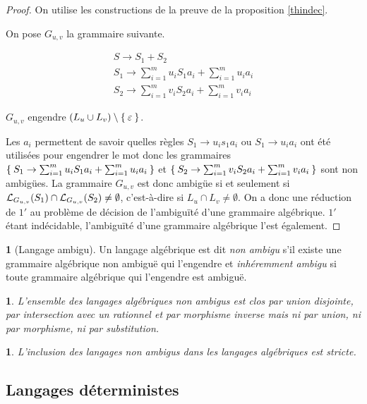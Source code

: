 \documentclass[11pt,a4paper]{article}
\theoremstyle{plain}
\theoremstyle{definition}
\newtheorem{defn}[thm]{\protect\definitionname}
\theoremstyle{definition}
\theoremstyle{remark}
\theoremstyle{remark}
\theoremstyle{plain}
\theoremstyle{plain}
\newtheorem{prop}[thm]{\protect\propositionname}
\theoremstyle{plain}
\theoremstyle{remark}
\providecommand{\definitionname}{Définition}
\providecommand{\propositionname}{Proposition}
\begin{document}
\begin{proof}
	On utilise les constructions de la preuve de la proposition \ref{thindec}.
	
	On pose $G_{u,v}$ la grammaire suivante.
	
	\[\begin{array}{l}
		\displaystyle S \to S_1 + S_2\\
		\displaystyle S_1 \to \sum_{i=1}^m u_i S_1 a_i + \sum_{i=1}^m u_i a_i\\
		\displaystyle S_2 \to \sum_{i=1}^m v_i S_2 a_i + \sum_{i=1}^m v_i a_i
	\end{array}\]
	
	$G_{u,v}$ engendre $(L_u\cup L_v)\setminus \Set{\varepsilon}$.
	
	Les $a_i$ permettent de savoir quelles règles $S_1\to u_i s_1 a_i$ ou $S_1\to u_i a_i$ ont été utilisées pour engendrer le mot donc les grammaires $\Set{S_1 \to \sum_{i=1}^m u_i S_1 a_i + \sum_{i=1}^m u_i a_i}$ et $\Set{S_2 \to \sum_{i=1}^m v_i S_2 a_i + \sum_{i=1}^m v_i a_i}$ sont non ambigües. La grammaire $G_{u,v}$ est donc ambigüe si et seulement si $\mathcal{L}_{G_{u,v}}(S_1)\cap \mathcal{L}_{G_{u,v}}(S_2)\not=\emptyset$, c'est-à-dire si $L_u\cap L_v\not=\emptyset$. On a donc une réduction de $1'$ au problème de décision de l'ambiguïté d'une grammaire algébrique. $1'$ étant indécidable, l'ambiguïté d'une grammaire algébrique l'est également.
\end{proof}

\begin{defn}[Langage ambigu] %
	Un langage algébrique est dit \emph{non ambigu} s'il existe une grammaire algébrique non ambiguë qui l'engendre et \emph{inhéremment ambigu} si toute grammaire algébrique qui l'engendre est ambiguë.
\end{defn}

\begin{prop}
	L'ensemble des langages algébriques non ambigus est clos par union disjointe, par intersection avec un rationnel et par morphisme inverse mais ni par union, ni par morphisme, ni par substitution. %
\end{prop}

\begin{prop} %
	L'inclusion des langages non ambigus dans les langages algébriques est stricte.
\end{prop}

\subsection{Langages déterministes} %
\end{document}
